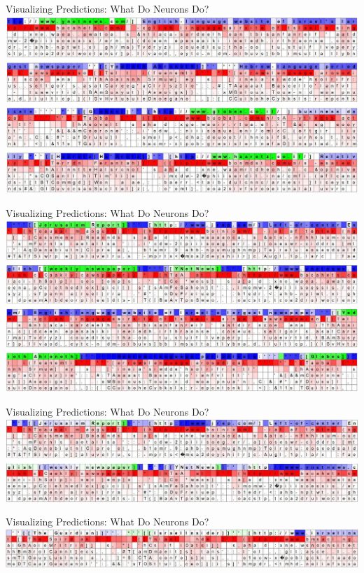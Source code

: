 \documentclass[10pt,xcolor=dvipsnames]{beamer}
\begin{document}
\begin{frame}{Visualizing Predictions: What Do Neurons Do?}
  \includegraphics[width=\linewidth]{fig/lstm-pred-1.jpeg}
\end{frame}
\begin{frame}{Visualizing Predictions: What Do Neurons Do?}
  \includegraphics[width=\linewidth]{fig/lstm-pred-2.jpeg}
\end{frame}
\begin{frame}{Visualizing Predictions: What Do Neurons Do?}
  \includegraphics[width=\linewidth]{fig/lstm-pred-3.jpeg}
\end{frame}
\begin{frame}{Visualizing Predictions: What Do Neurons Do?}
  \includegraphics[width=\linewidth]{fig/lstm-pred-4.jpeg}
\end{frame}
\end{document}
